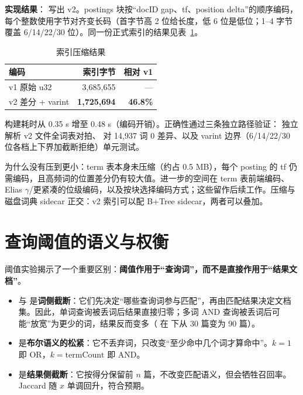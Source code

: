 \textbf{实现结果}： 写出 v2。postings 块按“docID gap、tf、position delta”的顺序编码，每个整数使用字节对齐变长码（首字节高 2 位给长度，低 6 位是低位；1--4 字节覆盖 6/14/22/30 位）。同一份正式索引的结果见表~\ref{tab:compression}。

\begin{table}[H]
  \centering
  \caption{索引压缩结果}
  \label{tab:compression}
  \small
  \begin{tabularx}{0.75\linewidth}{@{}l r r@{}}
    \toprule
    编码 & 索引字节 & 相对 v1 \\
    \midrule
    v1 原始 u32 & 3,685,655 & — \\
    v2 差分 + varint & \textbf{1,725,694} & \textbf{46.8\%} \\
    \bottomrule
  \end{tabularx}
\end{table}

构建耗时从 0.35 s 增至 0.48 s（编码开销）。正确性通过三条独立路径验证： 独立解析 v2 文件全词表对拍、 对 14,937 词 0 差异、以及 varint 边界（6/14/22/30 位各档上下界加截断拒绝）单元测试。

为什么没有压到更小：term 表本身未压缩（约占 0.5 MB），每个 posting 的 tf 仍需编码，且高频词的位置差分仍有较大值。进一步的空间在 term 表前端编码、Elias $\gamma$/更紧凑的位级编码，以及按块选择编码方式；这些留作后续工作。压缩与磁盘词典 sidecar 正交：v2 索引可以配 B+Tree sidecar，两者可以叠加。

\section{查询阈值的语义与权衡}

阈值实验揭示了一个重要区别：\textbf{阈值作用于“查询词”，而不是直接作用于“结果文档”}。

\begin{itemize}
  \item {} 与  是\textbf{词侧截断}：它们先决定“哪些查询词参与匹配”，再由匹配结果决定文档集。因此，单词查询被丢词后结果直接归零；多词 AND 查询被丢词后可能“放宽”为更少的词，结果反而变多（ 在  下从 30 篇变为 90 篇）。
  \item {} 是\textbf{布尔语义的松紧}：它不丢弃词，只改变“至少命中几个词才算命中”。$k=1$ 即 OR，$k=\text{termCount}$ 即 AND。
  \item {} 是\textbf{结果侧截断}：它按得分保留前 $n$ 篇，不改变匹配语义，但会牺牲召回率。Jaccard 随 $x$ 单调回升，符合预期。
\end{itemize}

